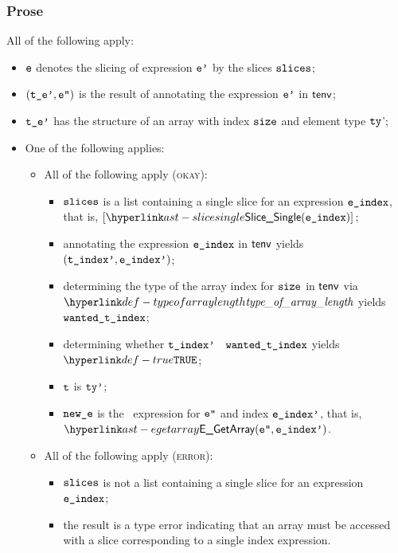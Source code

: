 \subsubsection{Prose}
All of the following apply:
\begin{itemize}
  \item $\texttt{e}$ denotes the slicing of expression $\texttt{e'}$ by the slices $\texttt{slices}$;
  \item $(\texttt{t\_e'},\texttt{e''})$ is the result of annotating the expression $\texttt{e'}$ in $\textsf{tenv}$;
  \item $\texttt{t\_e'}$ has the structure of an array with index $\texttt{size}$ and element type $\texttt{ty}$';
  \item One of the following applies:
  \begin{itemize}
    \item All of the following apply (\textsc{okay}):
    \begin{itemize}
      \item $\texttt{slices}$ is a list containing a single slice for an expression $\texttt{e\_index}$, that is, $[\SliceSingle(\eindex)]$;
      \item annotating the expression $\texttt{e\_index}$ in $\textsf{tenv}$ yields $(\texttt{t\_index'}, \texttt{e\_index'})$\ProseOrTypeError;
      \item determining the type of the array index for $\texttt{size}$ in $\textsf{tenv}$ via \\ $\typeofarraylength$
            yields $\texttt{wanted\_t\_index}$;
      \item determining whether $\texttt{t\_index'}$ \typesatisfies\ $\texttt{wanted\_t\_index}$ yields \\
            $\True$\ProseOrTypeError;
      \item $\texttt{t}$ is $\texttt{ty'}$;
      \item $\texttt{new\_e}$ is the \arrayaccess\ expression for $\texttt{e''}$ and index $\texttt{e\_index'}$, that is, $\EGetArray(\vepp, \eindexp)$.
    \end{itemize}

    \item All of the following apply (\textsc{error}):
    \begin{itemize}
      \item $\texttt{slices}$ is not a list containing a single slice for an expression $\texttt{e\_index}$;
      \item the result is a type error indicating that an array must be accessed with a slice corresponding
            to a single index expression.
    \end{itemize}
  \end{itemize}
\end{itemize}
